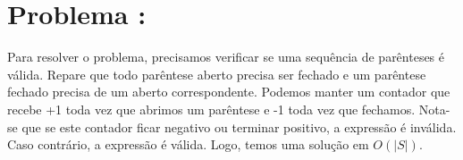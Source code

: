 \section*{Problema \proxLetra: }
Para resolver o problema, precisamos verificar se uma sequência de parênteses é válida. Repare que todo parêntese aberto precisa ser fechado e um parêntese fechado precisa de um aberto correspondente. Podemos manter um contador que recebe +1 toda vez que abrimos um parêntese e -1 toda vez que fechamos. Nota-se que se este contador ficar negativo ou terminar positivo, a expressão é inválida. Caso contrário, a expressão é válida. Logo, temos uma solução em $O(|S|)$.


